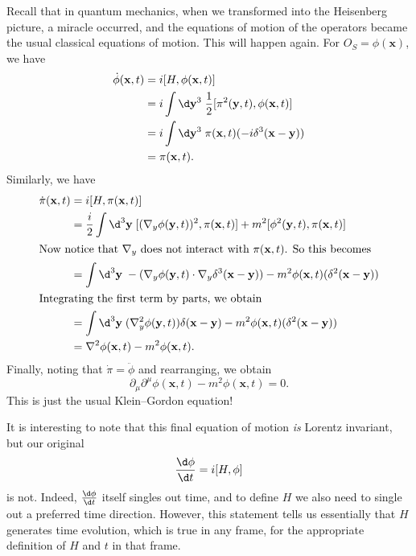 \documentclass[a4paper]{article}
\begin{document}
Recall that in quantum mechanics, when we transformed into the Heisenberg picture, a miracle occurred, and the equations of motion of the operators became the usual classical equations of motion. This will happen again. For $O_S = \phi(\mathbf{x})$, we have
\begin{align*}
  \dot{\phi}(\mathbf{x}, t) &= i[H, \phi(\mathbf{x}, t)] \\
  &= i\int \d \mathbf{y}^3\;\frac{1}{2}[\pi^2(\mathbf{y}, t), \phi(\mathbf{x}, t)]\\
  &= i\int \d \mathbf{y}^3\; \pi(\mathbf{x}, t) (-i \delta^3(\mathbf{x} - \mathbf{y}))\\
  &= \pi(\mathbf{x}, t).
\end{align*}
Similarly, we have
\begin{align*}
  \dot{\pi}(\mathbf{x}, t) &= i[H, \pi(\mathbf{x}, t)]\\
  &= \frac{i}{2}\int \d^3 \mathbf{y}\; [(\nabla_y \phi(\mathbf{y}, t))^2, \pi(\mathbf{x}, t)] + m^2 [\phi^2(\mathbf{y}, t), \pi(\mathbf{x}, t)]\\
  \intertext{Now notice that $\nabla_y$ does not interact with $\pi(\mathbf{x}, t)$. So this becomes}
  &= \int \d^3 \mathbf{y}\; -(\nabla_y \phi(\mathbf{y}, t) \cdot \nabla_y \delta^3(\mathbf{x} - \mathbf{y})) - m^2 \phi(\mathbf{x}, t) (\delta^2(\mathbf{x} - \mathbf{y}))\\
  \intertext{Integrating the first term by parts, we obtain}
  &= \int \d^3 \mathbf{y}\; (\nabla^2_y \phi(\mathbf{y}, t)) \delta(\mathbf{x} - \mathbf{y}) - m^2 \phi(\mathbf{x}, t) (\delta^2(\mathbf{x} - \mathbf{y}))\\
  &= \nabla^2 \phi(\mathbf{x}, t) - m^2 \phi(\mathbf{x}, t).
\end{align*}
Finally, noting that $\dot{\pi} = \ddot{\phi}$ and rearranging, we obtain
\[
  \partial_\mu \partial^\mu \phi(\mathbf{x}, t) - m^2 \phi(\mathbf{x}, t) = 0.
\]
This is just the usual Klein--Gordon equation!

It is interesting to note that this final equation of motion \emph{is} Lorentz invariant, but our original
\[
  \frac{\d \phi}{\d t} = i[H, \phi]
\]
is not. Indeed, $\frac{\d\phi}{\d t}$ itself singles out time, and to define $H$ we also need to single out a preferred time direction. However, this statement tells us essentially that $H$ generates time evolution, which is true in any frame, for the appropriate definition of $H$ and $t$ in that frame.
\end{document}
